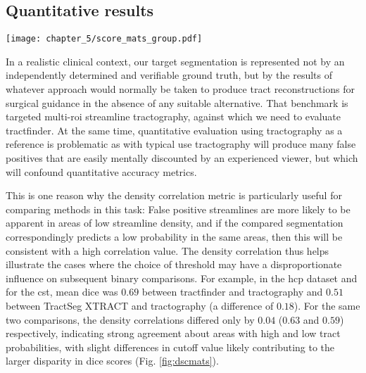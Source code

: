 \subsection{Quantitative results}\label{sec:quant}

\begin{SCfigure}
  \texttt{[image: chapter\_5/score\_mats\_group.pdf]}
  \caption[Pairwise DSC and density correlations for the \textit{TractoInferno}, HCP, and clinical datasets]{Pairwise  and density correlations for the \textit{TractoInferno} (top) HCP49 (middle) and clinical (bottom) datasets.
  Upper triangles show density correlation means (background colour) and distributions (white boxplots), lower triangles show the binary \glspl{dice} for each pairwise method comparison.
  For each combination, the metric distributions across all subjects are shown for the four tracts separately (from left to right: , , , ). 
  \label{fig:dscmats}}
\end{SCfigure}

In a realistic clinical context, our target segmentation is represented not by an independently determined and verifiable ground truth, but by the results of whatever approach would normally be taken to produce tract reconstructions for surgical guidance in the absence of any suitable alternative.
That benchmark is targeted multi-\gls{roi} streamline tractography, against which we need to evaluate tractfinder.
At the same time, quantitative evaluation using tractography as a reference is problematic as with typical use tractography will produce many false positives that are easily mentally discounted by an experienced viewer, but which will confound quantitative accuracy metrics.

This is one reason why the density correlation metric is particularly useful for comparing methods in this task:
False positive streamlines are more likely to be apparent in areas of low streamline density, and if the compared segmentation correspondingly predicts a low probability in the same areas, then this will be consistent with a high correlation value.
The density correlation thus helps illustrate the cases where the choice of threshold may have a disproportionate influence on subsequent binary comparisons.
For example, in the \gls{hcp} dataset and for the \gls{cst}, mean \gls{dice} was $0.69$ between tractfinder and tractography and $0.51$ between TractSeg XTRACT and tractography (a difference of $0.18$).
For the same two comparisons, the density correlations differed only by $0.04$ ($0.63$ and $0.59$) respectively, indicating strong agreement about areas with high and low tract probabilities, with slight differences in cutoff value likely contributing to the larger disparity in \gls{dice} scores (Fig. \ref{fig:dscmats}).

